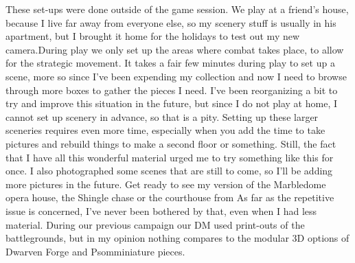 These set-ups were done outside of the game session. We play at a friend's house, because I live far away from everyone else, so my scenery stuff is usually in his apartment, but I brought it home for the holidays to test out my new camera.During play we only set up the areas where combat takes place, to allow for the strategic movement. It takes a fair few minutes during play to set up a scene, more so since I've been expending my collection and now I need to browse through more boxes to gather the pieces I need. I've been reorganizing a bit to try and improve this situation in the future, but since I do not play at home, I cannot set up scenery in advance, so that is a pity. Setting up these larger sceneries requires even more time, especially when you add the time to take pictures and rebuild things to make a second floor or something. Still, the fact that I have all this wonderful material urged me to try something like this for once. I also photographed some scenes that are still to come, so I'll be adding more pictures in the future. Get ready to see my version of the Marbledome opera house, the Shingle chase or the courthouse from As far as the repetitive issue is concerned, I've never been bothered by that, even when I had less material. During our previous campaign our DM used print-outs of the battlegrounds, but in my opinion nothing compares to the modular 3D options of Dwarven Forge and Psomminiature pieces. 